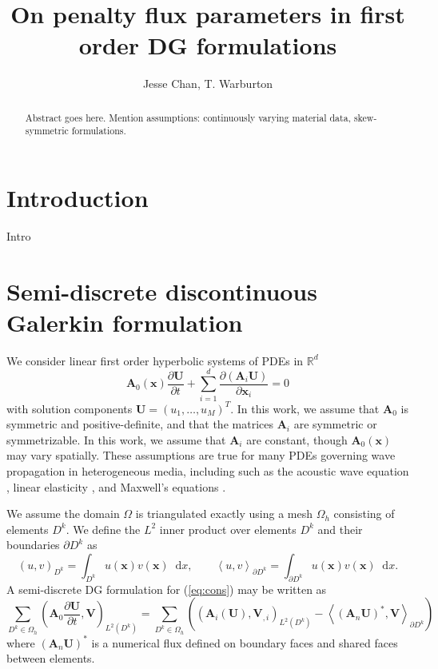 \documentclass[10pt]{article}
\date{}
\author{Jesse Chan, T. Warburton}
\title{On penalty flux parameters in first order DG formulations}
\newcommand{\pd}[2]{\frac{\partial#1}{\partial#2}}
\newcommand{\LRp}[1]{\left( #1 \right)}
\newcommand{\LRa}[1]{\left\langle #1 \right\rangle}
\newcommand{\Lk}{L^2\LRp{D^k}}
\newcommand{\Oh}{\Omega_h}
\newcommand{\note}[1]{{\color{blue}#1}}
\newcommand*\diff[1]{\mathop{}\!{\mathrm{d}#1}}
\begin{document}
\maketitle

\begin{abstract}
Abstract goes here.  Mention assumptions: continuously varying material data, skew-symmetric formulations.  
\end{abstract}

\section{Introduction}

\note{Intro}

\section{Semi-discrete discontinuous Galerkin formulation}

We consider linear first order hyperbolic systems of PDEs in $\mathbb{R}^d$
\begin{equation}
\bm{A}_0(\bm{x})\pd{\bm{U}}{t} + \sum_{i=1}^d \pd{\LRp{\bm{A}_{i}\bm{U}}}{\bm{x}_i} = 0
\label{eq:cons}
\end{equation}
with solution components $\bm{U} = (u_1, \ldots, u_M)^T$.  In this work, we assume that $\bm{A}_0$ is symmetric and positive-definite, and that the matrices $\bm{A}_i$ are symmetric or symmetrizable.  In this work, we assume that $\bm{A}_i$ are constant, though $\bm{A}_0(\bm{x})$ may vary spatially.  These assumptions are true for many PDEs governing wave propagation in heterogeneous media, including such as the acoustic wave equation \cite{chan2016weight1}, linear elasticity \cite{de2008interior,wilcox2010high,ye2016discontinuous}, and Maxwell's equations \cite{hesthaven2002nodal,grote2007interior,warburton2013low}.  

We assume the domain $\Omega$ is triangulated exactly using a mesh $\Oh$ consisting of elements $D^k$.  We define the $L^2$ inner product over elements $D^k$ and their boundaries $\partial D^k$ as
\[
\LRp{u,v}_{D^k} = \int_{D^k} u(\bm{x})v(\bm{x}) \diff x, \qquad \LRa{u,v}_{\partial D^k} = \int_{\partial D^k} u(\bm{x})v(\bm{x}) \diff x.
\]
A semi-discrete DG formulation for (\ref{eq:cons}) may be written as 
\begin{equation}
\sum_{D^k \in \Oh} \LRp{\bm{A}_0\pd{\bm{U}}{t},\bm{V} }_{\Lk} = \sum_{D^k \in \Oh}\LRp{ \LRp{\bm{A}_i(\bm{U}), \bm{V}_{,i}}_{\Lk} - \LRa{(\bm{A}_n\bm{U})^*,\bm{V}}_{\partial D^k}}
\label{eq:formulation}
\end{equation}
where $(\bm{A}_n\bm{U})^*$ is a numerical flux defined on boundary faces and shared faces between elements.  
\end{document}
